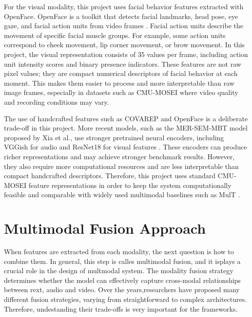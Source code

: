 For the visual modality, this project uses facial behavior features extracted with OpenFace. OpenFace is a toolkit that detects facial landmarks, head pose, eye gaze, and facial action units from video frames \cite{mora2021unimodal}. Facial action units describe the movement of specific facial muscle groups. For example, some action units correspond to cheek movement, lip corner movement, or brow movement. In this project, the visual representation consists of 35 values per frame, including action unit intensity scores and binary presence indicators. These features are not raw pixel values; they are compact numerical descriptors of facial behavior at each moment. This makes them easier to process and more interpretable than raw image frames, especially in datasets such as CMU-MOSEI where video quality and recording conditions may vary.

The use of handcrafted features such as COVAREP and OpenFace is a deliberate trade-off in this project. More recent models, such as the MER-SEM-MBT model proposed by Xia et al., use stronger pretrained neural encoders, including VGGish for audio and ResNet18 for visual features \cite{xia2022multimodal}. These encoders can produce richer representations and may achieve stronger benchmark results. However, they also require more computational resources and are less interpretable than compact handcrafted descriptors. Therefore, this project uses standard CMU-MOSEI feature representations in order to keep the system computationally feasible and comparable with widely used multimodal baselines such as MulT \cite{tsai2019multimodal}.

\section{Multimodal Fusion Approach}
When features are extracted from each modality,  the next question is how to combine them. In general, this step is calles multimodal fusion, and it isplays a crucial role in the design of multmodal system.  The modality fusion strategy determines whether the model can effectively capture cross-modal relationships between rext, audio and video. Over the years,researchers have proposed many different fusion strategies, varying from straightforward to complex architectures. Therefore, undestanding their trade-offs is very important for the frameworks.

